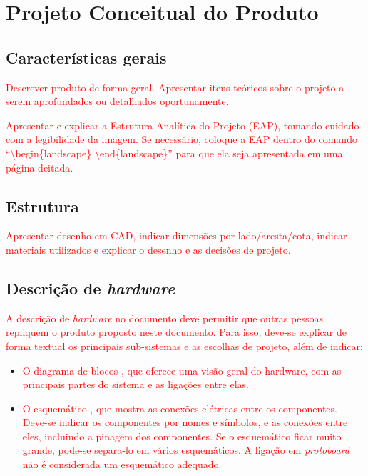 \chapter{Projeto Conceitual do Produto}

\section{Características gerais}

\textcolor{red}{Descrever produto de forma geral. Apresentar itens teóricos sobre o projeto a serem aprofundados ou detalhados oportunamente.}

\textcolor{red}{Apresentar e explicar a Estrutura Analítica do Projeto (EAP), tomando cuidado com a legibilidade da imagem. Se necessário, coloque a EAP dentro do comando ``\textsf{\textbackslash begin\{landscape\} \textbackslash end\{landscape\}}'' para que ela seja apresentada em uma página deitada.}

\section{Estrutura}

\textcolor{red}{Apresentar desenho em CAD, indicar dimensões por lado/aresta/cota, indicar materiais utilizados e explicar o desenho e as decisões de projeto.}

\section{Descrição de \textit{hardware}}

\textcolor{red}{A descrição de \textit{hardware} no documento deve permitir que outras pessoas repliquem o produto proposto neste documento. Para isso, deve-se explicar de forma textual os principais sub-sistemas e as escolhas de projeto, além de indicar:}

\begin{itemize}
    \item \textcolor{red}{ O diagrama de blocos \cite{blockdiagram}, que oferece uma visão geral do hardware, com as principais partes do sistema e as ligações entre elas.}
    \item \textcolor{red}{ O esquemático \cite{esquematico}, que mostra as conexões elétricas entre os componentes. Deve-se indicar os componentes por nomes e símbolos, e as conexões entre eles, incluindo a pinagem dos componentes. Se o esquemático ficar muito grande, pode-se separa-lo em vários esquemáticos. A ligação em \textit{protoboard} não é considerada um esquemático adequado.}
\end{itemize}

